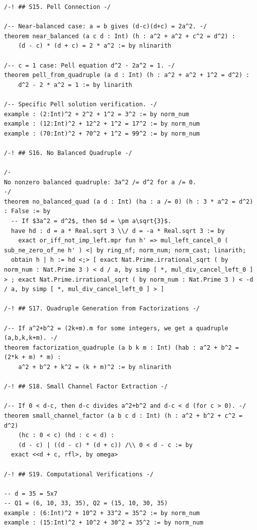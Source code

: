\documentclass[11pt,openright,twoside]{book}
\theoremstyle{definition}
\begin{document}
\begin{lstlisting}[style=lean]
/-! ## S15. Pell Connection -/

/-- Near-balanced case: a = b gives (d-c)(d+c) = 2a^2. -/
theorem near_balanced (a c d : Int) (h : a^2 + a^2 + c^2 = d^2) :
    (d - c) * (d + c) = 2 * a^2 := by nlinarith

/-- c = 1 case: Pell equation d^2 - 2a^2 = 1. -/
theorem pell_from_quadruple (a d : Int) (h : a^2 + a^2 + 1^2 = d^2) :
    d^2 - 2 * a^2 = 1 := by linarith

/-- Specific Pell solution verification. -/
example : (2:Int)^2 + 2^2 + 1^2 = 3^2 := by norm_num
example : (12:Int)^2 + 12^2 + 1^2 = 17^2 := by norm_num
example : (70:Int)^2 + 70^2 + 1^2 = 99^2 := by norm_num

/-! ## S16. No Balanced Quadruple -/

/-
No nonzero balanced quadruple: 3a^2 /= d^2 for a /= 0.
-/
theorem no_balanced_quad (a d : Int) (ha : a /= 0) (h : 3 * a^2 = d^2) : False := by
  -- If $3a^2 = d^2$, then $d = \pm a\sqrt{3}$.
  have hd : d = a * Real.sqrt 3 \\/ d = -a * Real.sqrt 3 := by
    exact or_iff_not_imp_left.mpr fun h' => mul_left_cancel_0 ( sub_ne_zero_of_ne h' ) <| by ring_nf; norm_num; norm_cast; linarith;
  obtain h | h := hd <;> [ exact Nat.Prime.irrational_sqrt ( by norm_num : Nat.Prime 3 ) < d / a, by simp [ *, mul_div_cancel_left_0 ] > ; exact Nat.Prime.irrational_sqrt ( by norm_num : Nat.Prime 3 ) < -d / a, by simp [ *, mul_div_cancel_left_0 ] > ]

/-! ## S17. Quadruple Generation from Factorizations -/

/-- If a^2+b^2 = (2k+m).m for some integers, we get a quadruple (a,b,k,k+m). -/
theorem factorization_quadruple (a b k m : Int) (hab : a^2 + b^2 = (2*k + m) * m) :
    a^2 + b^2 + k^2 = (k + m)^2 := by nlinarith

/-! ## S18. Small Channel Factor Extraction -/

/-- If 0 < d-c, then d-c divides a^2+b^2 and d-c < d (for c > 0). -/
theorem small_channel_factor (a b c d : Int) (h : a^2 + b^2 + c^2 = d^2)
    (hc : 0 < c) (hd : c < d) :
    (d - c) | ((d - c) * (d + c)) /\\ 0 < d - c := by
  exact <<d + c, rfl>, by omega>

/-! ## S19. Computational Verifications -/

-- d = 35 = 5x7
-- Q1 = (6, 10, 33, 35), Q2 = (15, 10, 30, 35)
example : (6:Int)^2 + 10^2 + 33^2 = 35^2 := by norm_num
example : (15:Int)^2 + 10^2 + 30^2 = 35^2 := by norm_num


\end{lstlisting}
\end{document}
